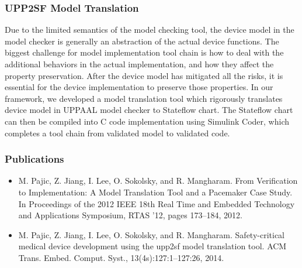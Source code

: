 \documentclass[a4paper]{article}
\begin{document}
\subsubsection{UPP2SF Model Translation}
Due to the limited semantics of the model checking tool, the device model in the model checker is generally an abstraction of the actual device functions.
The biggest challenge for model implementation tool chain is how to deal with the additional behaviors in the actual implementation, and how they affect the property preservation.
After the device model has mitigated all the risks, it is essential for the device implementation to preserve those properties.
In our framework, we developed a model translation tool which rigorously translates device model in UPPAAL model checker to Stateflow chart.
The Stateflow chart can then be compiled into C code implementation using Simulink Coder, which completes a tool chain from validated model to validated code.

\subsubsection{Publications}
\begin{itemize}
\item M. Pajic, Z. Jiang, I. Lee, O. Sokolsky, and R. Mangharam. From Verification to
Implementation: A Model Translation Tool and a Pacemaker Case Study. In Proceedings
of the 2012 IEEE 18th Real Time and Embedded Technology and Applications
Symposium, RTAS ’12, pages 173–184, 2012.
\item M. Pajic, Z. Jiang, I. Lee, O. Sokolsky, and R. Mangharam. Safety-critical medical
device development using the upp2sf model translation tool. ACM Trans. Embed.
Comput. Syst., 13(4s):127:1–127:26, 2014.
\end{itemize}

\newpage
\end{document}
